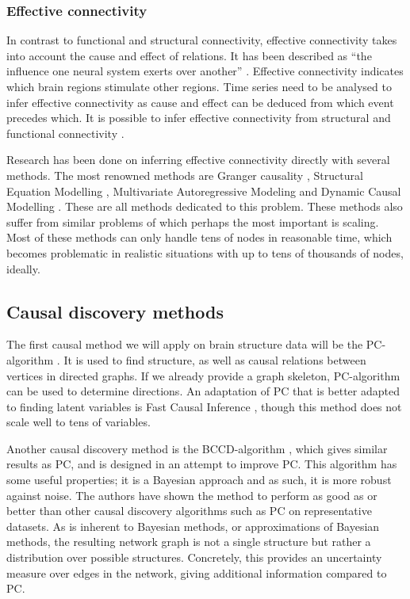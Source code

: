 \documentclass[a4paper, 10pt, english, twocolumn]{article}
\begin{document}
\subsubsection*{Effective connectivity}
In contrast to functional and structural connectivity, effective connectivity takes into account the cause and effect of relations.
It has been described as ``the influence one neural system exerts over another'' \cite{friston1994}.
Effective connectivity indicates which brain regions stimulate other regions.
Time series need to be analysed to infer effective connectivity as cause and effect can be deduced from which event precedes which. 
It is possible to infer effective connectivity from structural and functional connectivity \cite{mclntosh1994, harrison2003, friston2003, roebroeck2005}.

Research has been done on inferring effective connectivity directly with several methods.
The most renowned methods are Granger causality \cite{roebroeck2005}, Structural Equation Modelling \cite{mclntosh1994}, Multivariate Autoregressive Modeling \cite{harrison2003} and Dynamic Causal Modelling \cite{friston2003}.
These are all methods dedicated to this problem.
These methods also suffer from similar problems of which perhaps the most important is scaling.
Most of these methods can only handle tens of nodes in reasonable time, which becomes problematic in realistic situations with up to tens of thousands of nodes, ideally.

\subsection*{Causal discovery methods}
The first causal method we will apply on brain structure data will be the PC-algorithm \cite{spirtes2000}.
It is used to find structure, as well as causal relations between vertices in directed graphs. 
If we already provide a graph skeleton, PC-algorithm can be used to determine directions.
An adaptation of PC that is better adapted to finding latent variables is Fast Causal Inference \cite{spirtes2000}, though this method does not scale well to tens of variables.

Another causal discovery method is the BCCD-algorithm \cite{claassen2012}, which gives similar results as PC, and is designed in an attempt to improve PC.
This algorithm has some useful properties; it is a Bayesian approach and as such, it is more robust against noise.
The authors have shown the method to perform as good as or better than other causal discovery algorithms such as PC on representative datasets.
As is inherent to Bayesian methods, or approximations of Bayesian methods, the resulting network graph is not a  single structure but rather a distribution over possible structures.
Concretely, this provides an uncertainty measure over edges in the network, giving additional information compared to PC.
\end{document}
